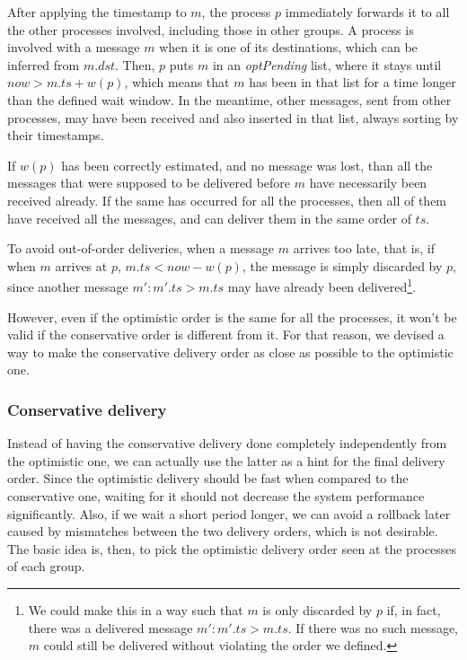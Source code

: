 \documentclass[times, 10pt]{article}
\begin{document}
After applying the timestamp to $m$, the process $p$ immediately forwards it to all the other processes involved, including those in other groups. A process is involved with a message $m$ when it is one of its destinations, which can be inferred from $m.dst$. Then, $p$ puts $m$ in an \mbox{\textit{optPending}} list, where it stays until $now>m.ts+w(p)$, which means that $m$ has been in that list for a time longer than the defined wait window. In the meantime, other messages, sent from other processes, may have been received and also inserted in that list, always sorting by their timestamps.

If $w(p)$ has been correctly estimated, and no message was lost, than all the messages that were supposed to be delivered before $m$ have necessarily been received already. If the same has occurred for all the processes, then all of them have received all the messages, and can deliver them in the same order of $ts$.

To avoid out-of-order deliveries, when a message $m$ arrives too late, that is, if when $m$ arrives at $p$, $m.ts < now - w(p)$, the message is simply discarded by $p$, since another message $m' : m'.ts > m.ts$ may have already been delivered\footnote{We could make this in a way such that $m$ is only discarded by $p$ if, in fact, there was a delivered message $m' : m'.ts > m.ts$. If there was no such message, $m$ could still be delivered without violating the order we defined.}.

However, even if the optimistic order is the same for all the processes, it won't be valid if the conservative order is different from it. For that reason, we devised a way to make the conservative delivery order as close as possible to the optimistic one.

\subsubsection{Conservative delivery}

Instead of having the conservative delivery done completely independently from the optimistic one, we can actually use the latter as a hint for the final delivery order. Since the optimistic delivery should be fast when compared to the conservative one, waiting for it should not decrease the system performance significantly. Also, if we wait a short period longer, we can avoid a rollback later caused by mismatches between the two delivery orders, which is not desirable. The basic idea is, then, to pick the optimistic delivery order seen at the processes of each group.
\end{document}
